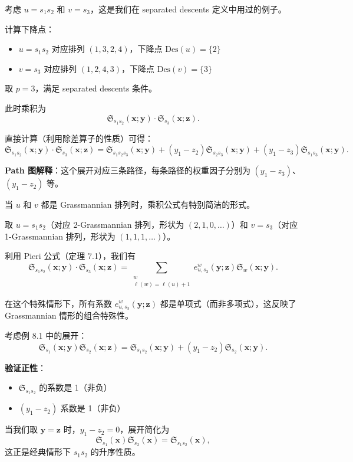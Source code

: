 \begin{Example}[例 8.5：更复杂的 $S_4$ 情形]
考虑 $u = s_1 s_2$ 和 $v = s_3$，这是我们在 separated descents 定义中用过的例子。

计算下降点：
\begin{itemize}
\item $u = s_1 s_2$ 对应排列 $(1,3,2,4)$，下降点 $\mathrm{Des}(u) = \{2\}$
\item $v = s_3$ 对应排列 $(1,2,4,3)$，下降点 $\mathrm{Des}(v) = \{3\}$
\end{itemize}

取 $p = 3$，满足 separated descents 条件。

此时乘积为
\[
\mathfrak{S}_{s_1s_2}(\mathbf{x}; \mathbf{y}) \cdot \mathfrak{S}_{s_3}(\mathbf{x}; \mathbf{z}).
\]

直接计算（利用除差算子的性质）可得：
\[
\mathfrak{S}_{s_1s_2}(\mathbf{x}; \mathbf{y}) \cdot \mathfrak{S}_{s_3}(\mathbf{x}; \mathbf{z}) = \mathfrak{S}_{s_1s_2s_3}(\mathbf{x}; \mathbf{y}) + (y_1 - z_2) \mathfrak{S}_{s_2s_3}(\mathbf{x}; \mathbf{y}) + (y_1 - z_3) \mathfrak{S}_{s_1s_3}(\mathbf{x}; \mathbf{y}).
\]

\textbf{Path 图解释}：这个展开对应三条路径，每条路径的权重因子分别为 $(y_1 - z_3)$、$(y_1 - z_2)$ 等。
\end{Example}

\begin{Example}
当 $u$ 和 $v$ 都是 Grassmannian 排列时，乘积公式有特别简洁的形式。

取 $u = s_1 s_2$（对应 2-Grassmannian 排列，形状为 $(2,1,0,\ldots)$）和 $v = s_3$（对应 1-Grassmannian 排列，形状为 $(1,1,1,\ldots)$）。

利用 Pieri 公式（定理 7.1），我们有
\[
\mathfrak{S}_{s_1s_2}(\mathbf{x}; \mathbf{y}) \cdot \mathfrak{S}_{s_3}(\mathbf{x}; \mathbf{z}) = \sum_{\substack{w \\ \ell(w) = \ell(u)+1}} e_{u,s_3}^w(\mathbf{y}; \mathbf{z}) \mathfrak{S}_w(\mathbf{x}; \mathbf{y}).
\]

在这个特殊情形下，所有系数 $e_{u,s_3}^w(\mathbf{y}; \mathbf{z})$ 都是单项式（而非多项式），这反映了 Grassmannian 情形的组合特殊性。
\end{Example}

\begin{Example}[例 8.7：验证非负性]
考虑例 8.1 中的展开：
\[
\mathfrak{S}_{s_1}(\mathbf{x}; \mathbf{y}) \mathfrak{S}_{s_2}(\mathbf{x}; \mathbf{z}) = \mathfrak{S}_{s_1s_2}(\mathbf{x}; \mathbf{y}) + (y_1 - z_2) \mathfrak{S}_{s_2}(\mathbf{x}; \mathbf{y}).
\]

\textbf{验证正性}：
\begin{itemize}
\item $\mathfrak{S}_{s_1s_2}$ 的系数是 1（非负）
\item $(y_1 - z_2)$ 系数是 1（非负）
\end{itemize}

当我们取 $\mathbf{y} = \mathbf{z}$ 时，$y_1 - z_2 = 0$，展开简化为
\[
\mathfrak{S}_{s_1}(\mathbf{x}) \mathfrak{S}_{s_2}(\mathbf{x}) = \mathfrak{S}_{s_1s_2}(\mathbf{x}),
\]
这正是经典情形下 $s_1 s_2$ 的升序性质。
\end{Example}

